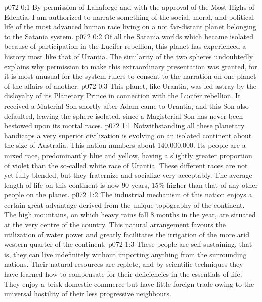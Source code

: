 \author{Melchizedek}
\vs p072 0:1 By permission of Lanaforge and with the approval of the Most Highs of Edentia, I am authorized to narrate something of the social, moral, and political life of the most advanced human race living on a not far\hyp{}distant planet belonging to the Satania system.
\vs p072 0:2 Of all the Satania worlds which became isolated because of participation in the Lucifer rebellion, this planet has experienced a history most like that of Urantia. The similarity of the two spheres undoubtedly explains why permission to make this extraordinary presentation was granted, for it is most unusual for the system rulers to consent to the narration on one planet of the affairs of another.
\vs p072 0:3 This planet, like Urantia, was led astray by the disloyalty of its Planetary Prince in connection with the Lucifer rebellion. It received a Material Son shortly after Adam came to Urantia, and this Son also defaulted, leaving the sphere isolated, since a Magisterial Son has never been bestowed upon its mortal races.
\vs p072 1:1 Notwithstanding all these planetary handicaps a very superior civilization is evolving on an isolated continent about the size of Australia. This nation numbers about 140,000,000. Its people are a mixed race, predominantly blue and yellow, having a slightly greater proportion of violet than the so\hyp{}called white race of Urantia. These different races are not yet fully blended, but they fraternize and socialize very acceptably. The average length of life on this continent is now 90 years, 15\% higher than that of any other people on the planet.
\vs p072 1:2 The industrial mechanism of this nation enjoys a certain great advantage derived from the unique topography of the continent. The high mountains, on which heavy rains fall 8 months in the year, are situated at the very centre of the country. This natural arrangement favours the utilization of water power and greatly facilitates the irrigation of the more arid western quarter of the continent.
\vs p072 1:3 These people are self\hyp{}sustaining, that is, they can live indefinitely without importing anything from the surrounding nations. Their natural resources are replete, and by scientific techniques they have learned how to compensate for their deficiencies in the essentials of life. They enjoy a brisk domestic commerce but have little foreign trade owing to the universal hostility of their less progressive neighbours.

